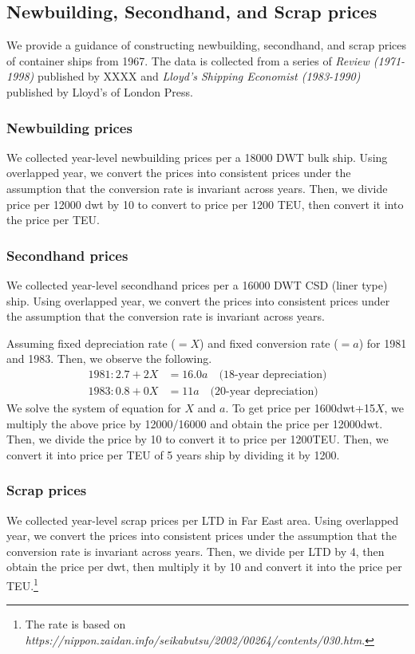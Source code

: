 \subsection{Newbuilding, Secondhand, and Scrap prices}
We provide a guidance of constructing newbuilding, secondhand, and scrap prices of container ships from 1967. The data is collected from a series of \textit{Review (1971-1998)} published by XXXX and \textit{Lloyd's Shipping Economist (1983-1990)} published by Lloyd's of London Press. 

\subsubsection{Newbuilding prices}
We collected year-level newbuilding prices per a 18000 DWT bulk ship. Using overlapped year, we convert the prices into consistent prices under the assumption that the conversion rate is invariant across years. Then, we divide price per 12000 dwt by 10 to convert to price per 1200 TEU, then convert it into the price per TEU.

\subsubsection{Secondhand prices}
We collected year-level secondhand prices per a 16000 DWT CSD (liner type) ship. Using overlapped year, we convert the prices into consistent prices under the assumption that the conversion rate is invariant across years.

Assuming fixed depreciation rate ($= X$) and fixed conversion rate ($= a$) for 1981 and 1983. Then, we observe the following.
\begin{align*}
    1981: 2.7 + 2X &= 16.0a \quad\text{(18-year depreciation)}\\
    1983: 0.8 + 0X &=11a \quad\text{(20-year depreciation)}
\end{align*}
We solve the system of equation for $X$ and $a$. To get price per 1600dwt+15$X$, we multiply the above price by 12000/16000 and obtain the price per 12000dwt. Then, we divide the price by 10 to convert it to price per 1200TEU. Then, we convert it into price per TEU of 5 years ship by dividing it by 1200.


\subsubsection{Scrap prices}

We collected year-level scrap prices per LTD in Far East area. Using overlapped year, we convert the prices into consistent prices under the assumption that the conversion rate is invariant across years. 
Then, we divide per LTD by 4, then obtain the price per dwt, then multiply it by 10 and convert it into the price per TEU.\footnote{The rate is based on \textit{https://nippon.zaidan.info/seikabutsu/2002/00264/contents/030.htm}.}


